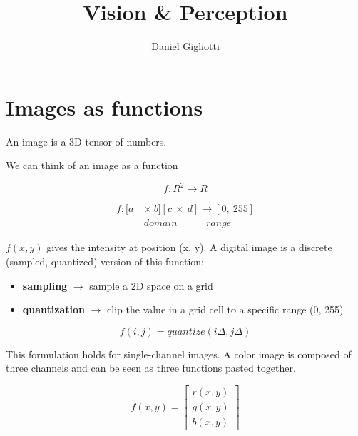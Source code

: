 \documentclass{article}
\title{\textbf{Vision \& Perception}}
\author{Daniel Gigliotti}
\date{}
\begin{document}
\maketitle

\tableofcontents

\newpage

\section*{Images as functions}

An image is a 3D tensor of numbers. 

We can think of an image as a function 

\begin{equation*}
f:R^2 \rightarrow R
\end{equation*}

\begin{equation*}
    \begin{split}
    f: [a\ & \times \ b][c\ \times\ d] \rightarrow [0,\ 255] \\
    & domain\ \ \ \ \ \ \ \ \ \ \ \ \ range
    \end{split}
\end{equation*}

$f(x, y)$ gives the intensity at position (x, y). A digital image is a discrete (sampled, quantized) version of this function:

\begin{itemize}
    \item \textbf{sampling} $\rightarrow$ sample a 2D space on a grid
    \item \textbf{quantization} $\rightarrow$ clip the value in a grid cell to a specific range (0, 255)
\end{itemize}

\begin{equation*}
    f(i, j) = quantize(i\Delta, j\Delta)
\end{equation*}

This formulation holds for single-channel images. A color image is composed of three channels and can be seen as three functions pasted together.

\begin{equation*}
    f(x,y)= \begin{bmatrix}
        r(x,y) \\
       g(x,y) \\
       b(x,y)
    \end{bmatrix}
\end{equation*}
\end{document}
